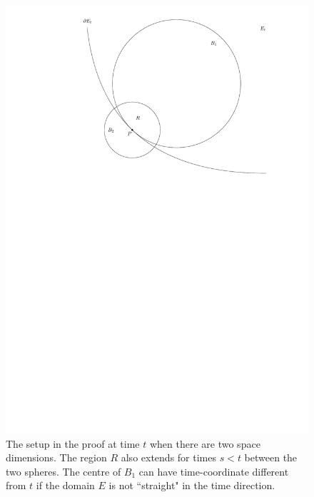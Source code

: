 \begin{figure}
	\centering
	\includegraphics[width=\textwidth]{figures/3_Hopf_boundary_point_lemma}
	\caption{The setup in the proof at time $t$ when there are two space dimensions. The region $R$ also extends for times $s<t$ between the two spheres. The centre of $B_1$ can have time-coordinate different from $t$ if the domain $E$ is not ``straight" in the time direction.}
\end{figure}
